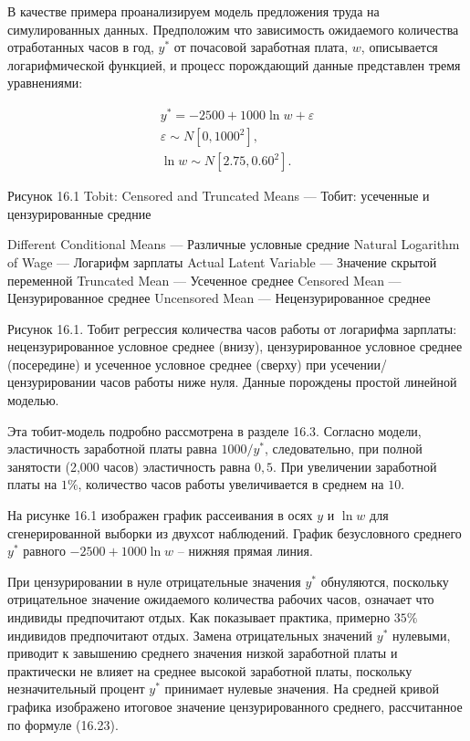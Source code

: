 В качестве примера проанализируем модель предложения труда на симулированных данных. Предположим что зависимость ожидаемого количества отработанных часов в год, $y^* $ от почасовой заработная плата, $w$, описывается логарифмической функцией, и процесс порождающий данные представлен тремя уравнениями:

\begin{equation}
\begin{array}{l}
y^* =-2500+1000 \ln w +\varepsilon\\
\varepsilon\sim N[0,1000^2],\\
\ln w \sim N[2.75,0.60^2].
\end{array}
\end{equation}

Рисунок 16.1
Tobit: Censored and Truncated Means --- Тобит: усеченные и цензурированные средние

Different Conditional Means --- Различные условные средние
Natural Logarithm of Wage --- Логарифм зарплаты
Actual Latent Variable --- Значение скрытой переменной
Truncated Mean --- Усеченное среднее
Censored Mean --- Цензурированное среднее
Uncensored Mean --- Нецензурированное среднее

Рисунок 16.1. Тобит регрессия количества часов работы от логарифма зарплаты: нецензурированное условное среднее (внизу), цензурированное условное среднее (посередине) и усеченное условное среднее (сверху) при усечении/цензурировании часов работы ниже нуля. Данные порождены простой линейной моделью.

Эта тобит-модель подробно рассмотрена в разделе 16.3. Согласно модели, эластичность заработной платы равна $1000/y^* $, следовательно, при полной занятости (2,000 часов) эластичность равна $0,5$. При увеличении заработной платы на $1\%$, количество часов работы увеличивается в среднем на $10$.

На рисунке 16.1 изображен график рассеивания в осях $y$ и $\ln{ w}$ для сгенерированной выборки из двухсот наблюдений. График безусловного среднего $y^* $ равного $-2500+1000 \ln w $ -- нижняя прямая линия.

При цензурировании в нуле отрицательные значения $y^* $ обнуляются, поскольку отрицательное значение ожидаемого количества рабочих часов, означает что индивиды предпочитают отдых. Как показывает практика, примерно $35\%$ индивидов предпочитают отдых. Замена отрицательных значений $y^* $ нулевыми, приводит к завышению среднего значения низкой заработной платы и практически не влияет на среднее высокой заработной платы, поскольку незначительный процент $y^* $ принимает нулевые значения. На средней кривой графика изображено итоговое значение цензурированного среднего, рассчитанное по формуле (16.23).


